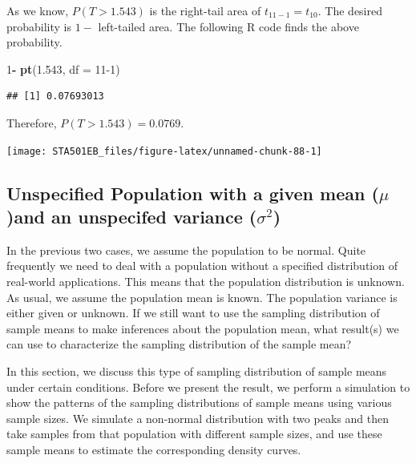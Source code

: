 \documentclass[
]{book}
\newenvironment{Shaded}{\begin{snugshade}}{\end{snugshade}}
\newcommand{\AttributeTok}[1]{\textcolor[rgb]{0.13,0.29,0.53}{#1}}
\newcommand{\DecValTok}[1]{\textcolor[rgb]{0.00,0.00,0.81}{#1}}
\newcommand{\FloatTok}[1]{\textcolor[rgb]{0.00,0.00,0.81}{#1}}
\newcommand{\FunctionTok}[1]{\textcolor[rgb]{0.13,0.29,0.53}{\textbf{#1}}}
\newcommand{\NormalTok}[1]{#1}
\newcommand{\SpecialCharTok}[1]{\textcolor[rgb]{0.81,0.36,0.00}{\textbf{#1}}}
\begin{document}
As we know, \(P(T > 1.543)\) is the right-tail area of \(t_{11-1} = t_{10}\). The desired probability is \(1-\) left-tailed area. The following R code finds the above probability.

\begin{Shaded}
\begin{Highlighting}[]
\DecValTok{1}\SpecialCharTok{{-}} \FunctionTok{pt}\NormalTok{(}\FloatTok{1.543}\NormalTok{, }\AttributeTok{df =} \DecValTok{11{-}1}\NormalTok{)}
\end{Highlighting}
\end{Shaded}

\begin{verbatim}
## [1] 0.07693013
\end{verbatim}

Therefore, \(P(T > 1.543) = 0.0769\).

\begin{center}\texttt{[image: STA501EB\_files/figure-latex/unnamed-chunk-88-1]} \end{center}

\hypertarget{unspecified-population-with-a-given-mean-muand-an-unspecifed-variance-sigma2}{%
\subsection{\texorpdfstring{Unspecified Population with a given mean (\(\mu\))and an unspecifed variance (\(\sigma^2\))}{Unspecified Population with a given mean (\textbackslash mu)and an unspecifed variance (\textbackslash sigma\^{}2)}}\label{unspecified-population-with-a-given-mean-muand-an-unspecifed-variance-sigma2}}

In the previous two cases, we assume the population to be normal. Quite frequently we need to deal with a population without a specified distribution of real-world applications. This means that the population distribution is unknown. As usual, we assume the population mean is known. The population variance is either given or unknown. If we still want to use the sampling distribution of sample means to make inferences about the population mean, what result(s) we can use to characterize the sampling distribution of the sample mean?

In this section, we discuss this type of sampling distribution of sample means under certain conditions. Before we present the result, we perform a simulation to show the patterns of the sampling distributions of sample means using various sample sizes. We simulate a non-normal distribution with two peaks and then take samples from that population with different sample sizes, and use these sample means to estimate the corresponding density curves.
\end{document}
